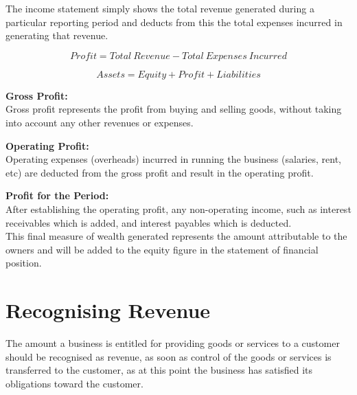 \documentclass{report}
\newenvironment{blackbox}[1][Black]
  {\begin{tcolorbox}[colframe=#1,colback=white]}
  {\end{tcolorbox}}
\begin{document}
The income statement simply shows the total revenue generated during a particular reporting period and deducts from this the total expenses incurred in generating that revenue. 

\begin{equation}
    Profit = Total \: Revenue - Total \: Expenses \: Incurred
\end{equation}

\begin{equation}
    Assets = Equity + Profit + Liabilities
\end{equation}

\begin{blackbox}
    \textbf{Gross Profit:}\\
    Gross profit represents the profit from buying and selling goods, without taking into account any other revenues or expenses.
\end{blackbox}

\begin{blackbox}
    \textbf{Operating Profit:}\\
    Operating expenses (overheads) incurred in running the business (salaries, rent, etc) are deducted from the gross profit and result in the operating profit.
\end{blackbox}

\begin{blackbox}
    \textbf{Profit for the Period:}\\
    After establishing the operating profit, any non-operating income, such as interest receivables which is added, and interest payables which is deducted.\\
    This final measure of wealth generated represents the amount attributable to the owners and will be added to the equity figure in the statement of financial position.
\end{blackbox}

\section{Recognising Revenue}

The amount a business is entitled for providing goods or services to a customer should be recognised as revenue, as soon as control of the goods or services is transferred to the customer, as at this point the business has satisfied its obligations toward the customer.\\
\end{document}
